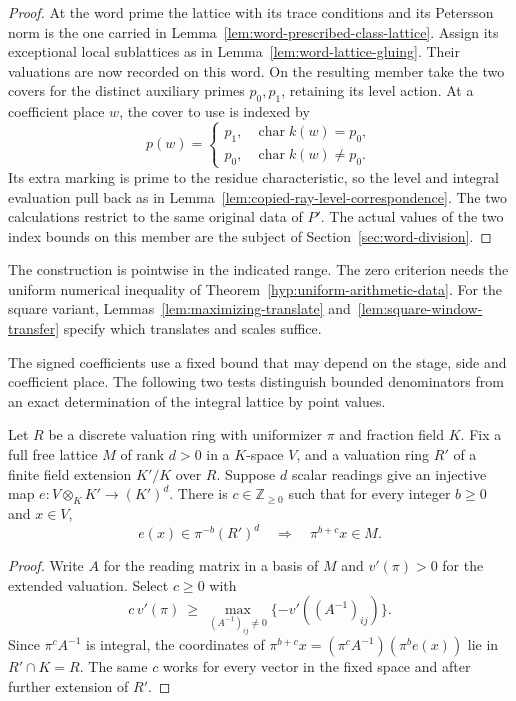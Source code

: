 \begin{proof}
At the word prime the lattice with its trace conditions and its
Petersson norm is the one carried in Lemma~\ref{lem:word-prescribed-class-lattice}.
Assign its exceptional local sublattices as in
Lemma~\ref{lem:word-lattice-gluing}. Their valuations are now recorded
on this word. On the resulting member take the two covers for the
distinct auxiliary primes \(p_0,p_1\), retaining its level action.
At a coefficient place \(w\), the cover to use is indexed by
\[
 p(w)=\begin{cases}
           p_1,&\operatorname{char} k(w)=p_0,\\
           p_0,&\operatorname{char} k(w)\ne p_0.
       \end{cases}
\]
Its extra marking is prime to the residue characteristic, so the
level and integral evaluation pull back as in
Lemma~\ref{lem:copied-ray-level-correspondence}. The two calculations
restrict to the same original data of \(P'\). The actual values of the
two index bounds on this member are the subject of
Section~\ref{sec:word-division}.
\end{proof}

The construction is pointwise in the indicated range. The zero
criterion needs the uniform numerical inequality of
Theorem~\ref{hyp:uniform-arithmetic-data}. For the square
variant, Lemmas~\ref{lem:maximizing-translate}
and~\ref{lem:square-window-transfer} specify which translates
and scales suffice. \label{cor:window-points-2}

The signed coefficients use a fixed bound that may depend on the
stage, side and coefficient place. The following two tests
distinguish bounded denominators from an exact determination of
the integral lattice by point values.

\begin{auxlemma}\label{lem:marked-bounded-denominator}
Let \(R\) be a discrete valuation ring with uniformizer \(\pi\)
and fraction field \(K\). Fix a full free lattice \(M\) of rank
\(d>0\) in a \(K\)-space \(V\), and a valuation ring \(R'\)
of a finite field extension \(K'/K\) over \(R\).
Suppose \(d\) scalar readings give an injective map
\(e:V\otimes_K K'\longrightarrow(K')^d\).
There is \(c\in\mathbb Z_{\ge0}\) such that for every integer \(b\ge0\) and \(x\in V\),
\[
           e(x)\in\pi^{-b}(R')^d
             \quad\Longrightarrow\quad \pi^{b+c}x\in M .
\]
\end{auxlemma}
\begin{proof}
Write \(A\) for the reading matrix in a basis of \(M\) and
\(v'(\pi)>0\) for the extended valuation. Select \(c\ge0\) with
\[
 c\,v'(\pi)\ \ge\
   \max_{(A^{-1})_{ij}\ne0}\{-v'((A^{-1})_{ij})\}.
\]
Since \(\pi^c A^{-1}\) is integral, the coordinates of
\(\pi^{b+c}x=(\pi^c A^{-1})(\pi^b e(x))\) lie in \(R'\cap K=R\).
The same \(c\) works for every vector in the fixed space and after
further extension of \(R'\).
\end{proof}

